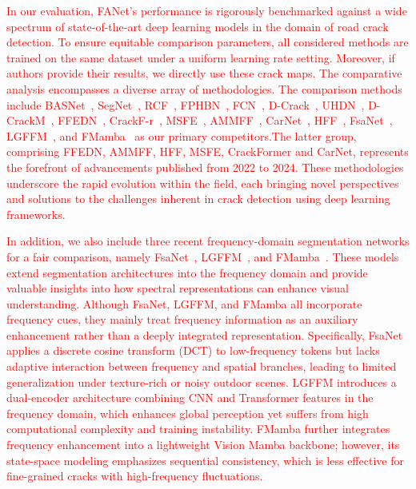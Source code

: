 \documentclass[lettersize,journal,onecolumn,12pt]{IEEEtran}
\begin{document}
\textcolor{red}{In our evaluation, FANet's performance is rigorously benchmarked against a wide spectrum of state-of-the-art deep learning models in the domain of road crack detection. To ensure equitable comparison parameters, all considered methods are trained on the same dataset under a uniform learning rate setting. Moreover, if authors provide their results, we directly use these crack maps. }\textcolor{red}{The comparative analysis encompasses a diverse array of methodologies. The comparison methods include BASNet~\cite{DBLP:conf/cvpr/QinZHGDJ19}, 
SegNet~\cite{DBLP:journals/corr/BadrinarayananK15}, 
RCF~\cite{DBLP:conf/cvpr/LiuCHWB17}, 
FPHBN~\cite{DBLP:journals/tits/YangZYPML20}, 
FCN~\cite{DBLP:conf/cvpr/LongSD15}, 
D-Crack~\cite{DBLP:journals/tip/ZouZLQWW19}, 
UHDN~\cite{DBLP:journals/corr/abs-2007-00477}, 
D-CrackM~\cite{DBLP:journals/ijon/LiuYLXL19}, 
FFEDN~\cite{DBLP:journals/tits/LiuZXZL22}, 
CrackF-r~\cite{DBLP:journals/tits/LiuYMMK23}, 
MSFE~\cite{DBLP:journals/tiv/ZhouQJ23}, 
AMMFF~\cite{DBLP:journals/tits/QuCWYL22}, 
CarNet~\cite{DBLP:journals/tits/LiYMWWTQ24}, 
HFF~\cite{DBLP:journals/tits/QuWWJ22}, 
FsaNet~\cite{DBLP:journals/tip/ZhangPG23}, 
LGFFM~\cite{11129883TMI}, 
and FMamba~\cite{DBLP:journals/tim/LiuLLWZS25} as our primary competitors.}\textcolor{red}{The latter group, comprising FFEDN, AMMFF, HFF, MSFE, CrackFormer and CarNet, represents the forefront of advancements published from 2022 to 2024. These methodologies underscore the rapid evolution within the field, each bringing novel perspectives and solutions to the challenges inherent in crack detection using deep learning frameworks.}

%
%

\par
\textcolor{red}{
In addition, we also include three recent frequency-domain segmentation networks for a fair comparison, 
namely FsaNet~\cite{DBLP:journals/tip/ZhangPG23}, 
LGFFM~\cite{11129883TMI}, 
and FMamba~\cite{DBLP:journals/tim/LiuLLWZS25}. 
These models extend segmentation architectures into the frequency domain and provide valuable insights into how spectral representations can enhance visual understanding.
}\textcolor{red}{
Although FsaNet, LGFFM, and FMamba all incorporate frequency cues, they mainly treat frequency information as an auxiliary enhancement rather than a deeply integrated representation. 
Specifically, FsaNet applies a discrete cosine transform (DCT) to low-frequency tokens but lacks adaptive interaction between frequency and spatial branches, leading to limited generalization under texture-rich or noisy outdoor scenes. 
LGFFM introduces a dual-encoder architecture combining CNN and Transformer features in the frequency domain, which enhances global perception yet suffers from high computational complexity and training instability. 
FMamba further integrates frequency enhancement into a lightweight Vision Mamba backbone; however, its state-space modeling emphasizes sequential consistency, which is less effective for fine-grained cracks with high-frequency fluctuations.
}
\end{document}
